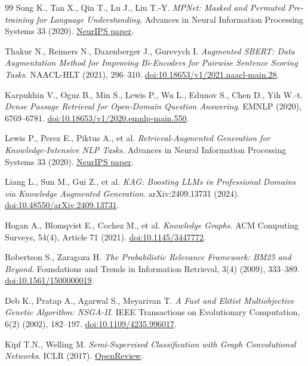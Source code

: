 \documentclass[twoside,11pt]{article}
\begin{document}
\begin{thebibliography}{99}
Song K., Tan X., Qin T., Lu J., Liu T.-Y.
\emph{MPNet: Masked and Permuted Pre-training for Language Understanding}.
Advances in Neural Information Processing Systems 33 (2020).
\href{https://proceedings.neurips.cc/paper/2020/hash/c3a690be93aa602ee2dc0ccab5b7b67e-Abstract.html}{NeurIPS paper}.

Thakur N., Reimers N., Daxenberger J., Gurevych I.
\emph{Augmented SBERT: Data Augmentation Method for Improving Bi-Encoders for Pairwise Sentence Scoring Tasks}.
NAACL-HLT (2021), 296--310.
\href{https://doi.org/10.18653/v1/2021.naacl-main.28}{doi:10.18653/v1/2021.naacl-main.28}.

Karpukhin V., Oguz B., Min S., Lewis P., Wu L., Edunov S., Chen D., Yih W.-t.
\emph{Dense Passage Retrieval for Open-Domain Question Answering}.
EMNLP (2020), 6769--6781.
\href{https://doi.org/10.18653/v1/2020.emnlp-main.550}{doi:10.18653/v1/2020.emnlp-main.550}.

Lewis P., Perez E., Piktus A., et al.
\emph{Retrieval-Augmented Generation for Knowledge-Intensive NLP Tasks}.
Advances in Neural Information Processing Systems 33 (2020).
\href{https://proceedings.neurips.cc/paper/2020/hash/6b493230-Abstract.html}{NeurIPS paper}.

Liang L., Sun M., Gui Z., et al.
\emph{KAG: Boosting LLMs in Professional Domains via Knowledge Augmented Generation}.
arXiv:2409.13731 (2024).
\href{https://doi.org/10.48550/arXiv.2409.13731}{doi:10.48550/arXiv.2409.13731}.

Hogan A., Blomqvist E., Cochez M., et al.
\emph{Knowledge Graphs}.
ACM Computing Surveys, 54(4), Article 71 (2021).
\href{https://doi.org/10.1145/3447772}{doi:10.1145/3447772}.

Robertson S., Zaragoza H.
\emph{The Probabilistic Relevance Framework: BM25 and Beyond}.
Foundations and Trends in Information Retrieval, 3(4) (2009), 333--389.
\href{https://doi.org/10.1561/1500000019}{doi:10.1561/1500000019}.

Deb K., Pratap A., Agarwal S., Meyarivan T.
\emph{A Fast and Elitist Multiobjective Genetic Algorithm: NSGA-II}.
IEEE Transactions on Evolutionary Computation, 6(2) (2002), 182--197.
\href{https://doi.org/10.1109/4235.996017}{doi:10.1109/4235.996017}.

Kipf T.N., Welling M.
\emph{Semi-Supervised Classification with Graph Convolutional Networks}.
ICLR (2017).
\href{https://openreview.net/forum?id=SJU4ayYgl}{OpenReview}.


\end{thebibliography}
\end{document}
